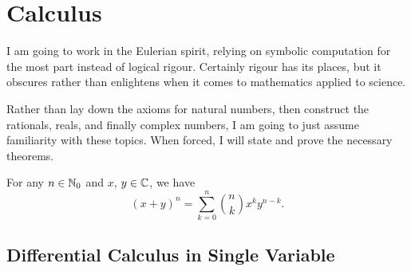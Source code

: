
\chapter{Calculus}


\begin{node}\label{calculus-0000}%
I am going to work in the Eulerian spirit, relying on symbolic
computation for the most part instead of logical rigour. Certainly
rigour has its places, but it obscures rather than enlightens when it
comes to mathematics applied to science.

Rather than lay down the axioms for natural numbers, then construct the
rationals, reals, and finally complex numbers, I am going to just assume
familiarity with these topics. When forced, I will state and prove the
necessary theorems.
\end{node}

\begin{theorem}[Binomial]\label{calculus-000B}%
For any $n\in\mathbb{N}_{0}$ and $x$, $y\in\mathbb{C}$, we have
\[(x+y)^{n} = \sum^{n}_{k=0}\binom{n}{k}x^{k}y^{n-k}.\]
\end{theorem}

\section{Differential Calculus in Single Variable}

